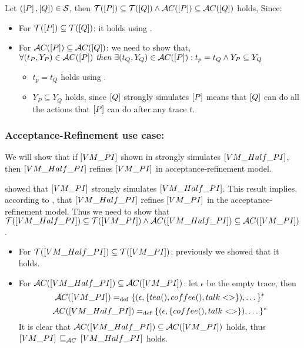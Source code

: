 \begin{prf}
Let $(\left[P\right],\left[Q\right])\in{}\mathcal{S}$, then $\traces[P]\subseteq\traces[Q] \wedge \accepatances[P]\subseteq\accepatances[Q]$ holds, Since:
\begin{itemize}
\item For $\traces[P]\subseteq\traces[Q]$: it holds using .
\item For $\accepatances[P]\subseteq\accepatances[Q]$: we need to show that,\\$\forall (t_P, Y_P) \in \accepatances[P] \textit{ then } \exists (t_Q, Y_Q) \in \accepatances[P]: t_p = t_Q \wedge Y_P \subseteq Y_Q$
\begin{itemize}
\item $t_p = t_Q$ holds using .
\item $Y_P \subseteq Y_Q$ holds, since $\left[Q\right]$ strongly simulates $\left[P\right]$ means that $\left[Q\right]$ can do all the actions that $\left[P\right]$ can do after any trace $t$.
\end{itemize}
\end{itemize}
\end{prf}
\subsubsection{Acceptance-Refinement use case:}
 We will show that if $\left[VM\_PI\right]$ shown in  strongly simulates $\left[VM\_Half\_PI\right]$, then $\left[VM\_Half\_PI\right]$ refines $\left[VM\_PI\right]$ in acceptance-refinement model.
 
  showed that $\left[VM\_PI\right]$ strongly simulates $\left[VM\_Half\_PI\right]$. This result implies, according to , that $\left[VM\_Half\_PI\right]$ refines $\left[VM\_PI\right]$ in the acceptance-refinement model. Thus we need to show that $\traces[VM\_Half\_PI]\subseteq\traces[VM\_PI] \wedge \accepatances[VM\_Half\_PI]\subseteq\accepatances[VM\_PI]$.
 
 \begin{itemize}
\item For $\traces[VM\_Half\_PI]\subseteq\traces[VM\_PI]$: previously we showed that it holds. 

\item For $\accepatances[VM\_Half\_PI]\subseteq\accepatances[VM\_PI]$: let $\epsilon$ be the empty trace, then
    \[\accepatances[VM\_PI] \define \{(\epsilon,\{tea(),coffee(),talk<>\}),\dots\}^\ast\]
    \[\accepatances[VM\_Half\_PI] \define \{(\epsilon,\{coffee(),talk<>\}),\dots\}^\ast\]
It is clear that $\accepatances[VM\_Half\_PI]\subseteq\accepatances[VM\_PI]$ holds, thus $\ec{VM\_PI} \refiAC \ec{VM\_Half\_PI}$ holds.
\end{itemize}